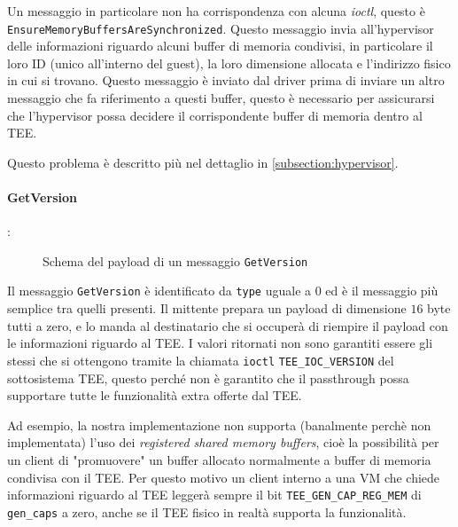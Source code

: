 \documentclass[12pt,italian]{report}
\begin{document}
\bigbreak \noindent

Un messaggio in particolare non ha corrispondenza con alcuna \textit{ioctl},
questo è \texttt{EnsureMemoryBuffersAreSynchronized}.
Questo messaggio invia all'hypervisor delle informazioni riguardo alcuni
buffer di memoria condivisi, in particolare il loro ID
(unico all'interno del guest), la loro dimensione allocata e
l'indirizzo fisico in cui si trovano.
Questo messaggio è inviato dal driver prima di inviare un altro messaggio
che fa riferimento a questi buffer, questo è necessario per assicurarsi
che l'hypervisor possa decidere il corrispondente buffer di memoria dentro al TEE.

Questo problema è descritto più nel dettaglio in \ref{subsection:hypervisor}.


\paragraph{GetVersion}:

\begin{figure}[H]
    \centering
    \caption{Schema del payload di un messaggio \texttt{GetVersion}}
    \label{fig:msg-schema-getversion}
\end{figure} 

Il messaggio \texttt{GetVersion} è identificato da \texttt{type} uguale a
$0$ ed è il messaggio più semplice tra quelli presenti.
Il mittente prepara un payload di dimensione $16$ byte tutti a zero, e lo
manda al destinatario che si occuperà di riempire il payload con le
informazioni riguardo al TEE.
I valori ritornati non sono garantiti essere gli stessi che si ottengono 
tramite la chiamata \texttt{ioctl} \texttt{TEE\_IOC\_VERSION} del
sottosistema TEE, questo perché non è garantito che il passthrough
possa supportare tutte le funzionalità extra offerte dal TEE.

Ad esempio, la nostra implementazione non supporta
(banalmente perchè non implementata)
l'uso dei \textit{registered shared memory buffers}, cioè la possibilità per
un client di "promuovere" un buffer allocato normalmente a buffer di memoria
condivisa con il TEE.
Per questo motivo un client interno a una VM che chiede informazioni riguardo
al TEE leggerà sempre il bit \texttt{TEE\_GEN\_CAP\_REG\_MEM} di
\texttt{gen\_caps} a zero, anche se il TEE fisico in realtà supporta la
funzionalità.
\end{document}
